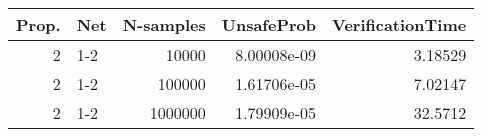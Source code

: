 \begin{tabular}{rlrrr}
\hline
   Prop. & Net   &   N-samples &   UnsafeProb &   VerificationTime \\
\hline
       2 & 1-2   &       10000 &  8.00008e-09 &            3.18529 \\
       2 & 1-2   &      100000 &  1.61706e-05 &            7.02147 \\
       2 & 1-2   &     1000000 &  1.79909e-05 &           32.5712  \\
\hline
\end{tabular}

